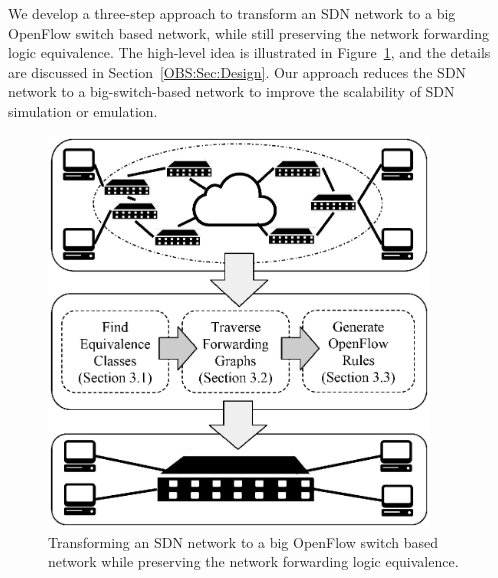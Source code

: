 We develop a three-step approach to transform an SDN network to a big OpenFlow switch based network,
while still preserving the network forwarding logic equivalence.
The high-level idea is illustrated in Figure~\ref{OBS:Fig:BigSimOverview},
and the details are discussed in Section~\ref{OBS:Sec:Design}.
Our approach reduces the SDN network to a big-switch-based network to improve the scalability of SDN simulation or emulation.

\begin{figure}[t]
    \centering
    \includegraphics[width=0.9\textwidth]{OneBigSwitch/figures/BigSimOverview.eps}
    \caption[One Big Switch Abstraction Overview]{Transforming an SDN network to a
    big OpenFlow switch based network while preserving the network forwarding logic equivalence.}
    \label{OBS:Fig:BigSimOverview}
\end{figure}

